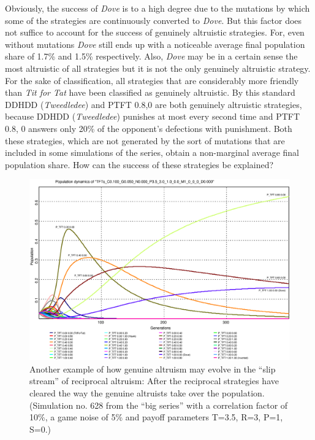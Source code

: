 Obviously, the success of {\em Dove} is to a high degree due to the mutations
by which some of the strategies are continuously converted to {\em Dove}. But
this factor does not suffice to account for the success of genuinely
altruistic strategies. For, even without mutations {\em Dove} still ends up
with a noticeable average final population share of 1.7\% and 1.5\%
respectively. Also, {\em Dove} may be in a certain sense the most altruistic
of all strategies but it is not the only genuinely altruistic strategy. For
the sake of classification, all strategies that are considerably more friendly
than {\em Tit for Tat} have been classified as genuinely altruistic.  By this
standard DDHDD ({\em Tweedledee}) and PTFT 0.8,0 are both genuinely altruistic
strategies, because DDHDD ({\em Tweedledee}) punishes at most every second
time and PTFT 0.8, 0 answers only 20\% of the opponent's defections with
punishment. Both these strategies, which are not generated by the sort of
mutations that are included in some simulations of the series, obtain a non-marginal 
average final population share. How can the success of these
strategies be explained?

\begin{figure}
\begin{center}
\includegraphics[width=20cm]{images/slipstream2_refined.eps} %
\caption{\label{slipstream2} Another example of how genuine altruism may
  evolve in the ``slip stream'' of reciprocal altruism: After the reciprocal
  strategies have cleared the way the genuine altruists take over the
  population. (Simulation no. 628 from the ``big series'' with a correlation
factor of 10\%, a game noise of 5\% and payoff parameters T=3.5, R=3, P=1,
S=0.)}
\end{center}
\end{figure}

